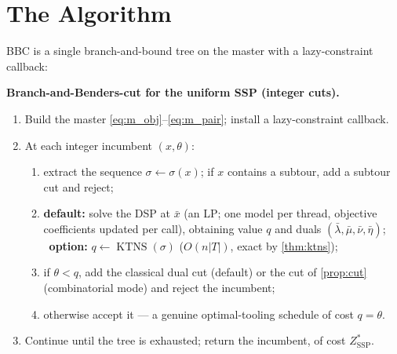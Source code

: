 \documentclass[11pt,a4paper]{article}
\theoremstyle{plain}
\theoremstyle{definition}
\DeclareMathOperator{\KTNS}{KTNS}
\newcommand{\ZSSP}{Z_{\mathrm{SSP}}^{*}}
\begin{document}
\section{The Algorithm}
\label{sec:algo}

BBC is a single branch-and-bound tree on the master with a lazy-constraint callback:

\begin{thmbox}
\textbf{Branch-and-Benders-cut for the uniform SSP (integer cuts).}
\begin{enumerate}[label=\textbf{\arabic*.},leftmargin=2.2em]
\item Build the master \eqref{eq:m_obj}--\eqref{eq:m_pair}; install a lazy-constraint callback.
\item At each integer incumbent $(x,\theta)$:
\begin{enumerate}[label=(\alph*),leftmargin=2em]
\item extract the sequence $\sigma\gets\sigma(x)$; if $x$ contains a subtour, add a subtour
  cut and reject;
\item \textbf{default:} solve the DSP at $\bar x$ (an LP; one model per thread, objective
  coefficients updated per call), obtaining value $q$ and duals
  $(\bar\lambda,\bar\mu,\bar\nu,\bar\eta)$; \ \textbf{option:} $q\gets\KTNS(\sigma)$
  ($O(n|T|)$, exact by \cref{thm:ktns});
\item if $\theta<q$, add the classical dual cut (default) or the cut of \cref{prop:cut}
  (combinatorial mode) and reject the incumbent;
\item otherwise accept it --- a genuine optimal-tooling schedule of cost $q=\theta$.
\end{enumerate}
\item Continue until the tree is exhausted; return the incumbent, of cost $\ZSSP$.
\end{enumerate}
\end{thmbox}
\end{document}

